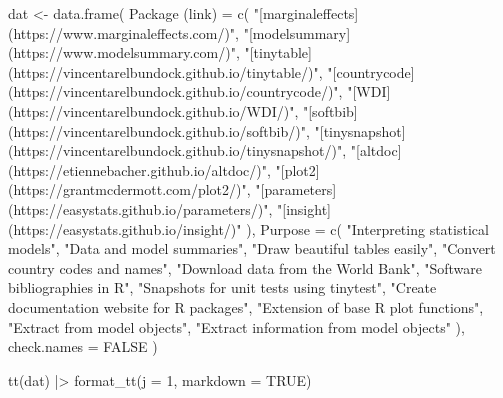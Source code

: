 \documentclass[
  letterpaper,
  DIV=11,
  numbers=noendperiod]{scrartcl}
\newenvironment{Shaded}{\begin{snugshade}}{\end{snugshade}}
\newcommand{\AttributeTok}[1]{\textcolor[rgb]{0.40,0.45,0.13}{#1}}
\newcommand{\ConstantTok}[1]{\textcolor[rgb]{0.56,0.35,0.01}{#1}}
\newcommand{\DecValTok}[1]{\textcolor[rgb]{0.68,0.00,0.00}{#1}}
\newcommand{\FunctionTok}[1]{\textcolor[rgb]{0.28,0.35,0.67}{#1}}
\newcommand{\NormalTok}[1]{\textcolor[rgb]{0.00,0.23,0.31}{#1}}
\newcommand{\OtherTok}[1]{\textcolor[rgb]{0.00,0.23,0.31}{#1}}
\newcommand{\SpecialCharTok}[1]{\textcolor[rgb]{0.37,0.37,0.37}{#1}}
\newcommand{\StringTok}[1]{\textcolor[rgb]{0.13,0.47,0.30}{#1}}
\begin{document}
\begin{Shaded}
\begin{Highlighting}[]
\NormalTok{dat }\OtherTok{\textless{}{-}} \FunctionTok{data.frame}\NormalTok{(}
  \StringTok{\textasciigrave{}}\AttributeTok{Package (link)}\StringTok{\textasciigrave{}} \OtherTok{=} \FunctionTok{c}\NormalTok{(}
    \StringTok{"[\textasciigrave{}marginaleffects\textasciigrave{}](https://www.marginaleffects.com/)"}\NormalTok{,}
    \StringTok{"[\textasciigrave{}modelsummary\textasciigrave{}](https://www.modelsummary.com/)"}\NormalTok{,}
    \StringTok{"[\textasciigrave{}tinytable\textasciigrave{}](https://vincentarelbundock.github.io/tinytable/)"}\NormalTok{,}
    \StringTok{"[\textasciigrave{}countrycode\textasciigrave{}](https://vincentarelbundock.github.io/countrycode/)"}\NormalTok{,}
    \StringTok{"[\textasciigrave{}WDI\textasciigrave{}](https://vincentarelbundock.github.io/WDI/)"}\NormalTok{,}
    \StringTok{"[\textasciigrave{}softbib\textasciigrave{}](https://vincentarelbundock.github.io/softbib/)"}\NormalTok{,}
    \StringTok{"[\textasciigrave{}tinysnapshot\textasciigrave{}](https://vincentarelbundock.github.io/tinysnapshot/)"}\NormalTok{,}
    \StringTok{"[\textasciigrave{}altdoc\textasciigrave{}](https://etiennebacher.github.io/altdoc/)"}\NormalTok{,}
    \StringTok{"[\textasciigrave{}plot2\textasciigrave{}](https://grantmcdermott.com/plot2/)"}\NormalTok{,}
    \StringTok{"[\textasciigrave{}parameters\textasciigrave{}](https://easystats.github.io/parameters/)"}\NormalTok{,}
    \StringTok{"[\textasciigrave{}insight\textasciigrave{}](https://easystats.github.io/insight/)"}
\NormalTok{  ),}
  \AttributeTok{Purpose =} \FunctionTok{c}\NormalTok{(}
    \StringTok{"Interpreting statistical models"}\NormalTok{,}
    \StringTok{"Data and model summaries"}\NormalTok{,}
    \StringTok{"Draw beautiful tables easily"}\NormalTok{,}
    \StringTok{"Convert country codes and names"}\NormalTok{,}
    \StringTok{"Download data from the World Bank"}\NormalTok{,}
    \StringTok{"Software bibliographies in R"}\NormalTok{,}
    \StringTok{"Snapshots for unit tests using \textasciigrave{}tinytest\textasciigrave{}"}\NormalTok{,}
    \StringTok{"Create documentation website for R packages"}\NormalTok{,}
    \StringTok{"Extension of base R plot functions"}\NormalTok{,}
    \StringTok{"Extract from model objects"}\NormalTok{,}
    \StringTok{"Extract information from model objects"}
\NormalTok{  ),}
  \AttributeTok{check.names =} \ConstantTok{FALSE}
\NormalTok{)}

\FunctionTok{tt}\NormalTok{(dat) }\SpecialCharTok{|\textgreater{}} \FunctionTok{format\_tt}\NormalTok{(}\AttributeTok{j =} \DecValTok{1}\NormalTok{, }\AttributeTok{markdown =} \ConstantTok{TRUE}\NormalTok{)}
\end{Highlighting}
\end{Shaded}
\end{document}
